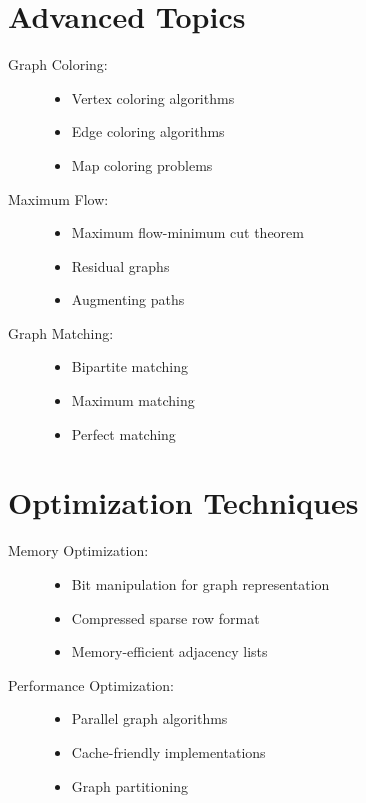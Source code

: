 \section*{Advanced Topics}
\begin{description}
    \item[Graph Coloring:] 
        \begin{itemize}
            \item Vertex coloring algorithms
            \item Edge coloring algorithms
            \item Map coloring problems
        \end{itemize}
    
    \item[Maximum Flow:] 
        \begin{itemize}
            \item Maximum flow-minimum cut theorem
            \item Residual graphs
            \item Augmenting paths
        \end{itemize}
        
    \item[Graph Matching:] 
        \begin{itemize}
            \item Bipartite matching
            \item Maximum matching
            \item Perfect matching
        \end{itemize}
\end{description}

\section*{Optimization Techniques}
\begin{description}
    \item[Memory Optimization:] 
        \begin{itemize}
            \item Bit manipulation for graph representation
            \item Compressed sparse row format
            \item Memory-efficient adjacency lists
        \end{itemize}
    
    \item[Performance Optimization:] 
        \begin{itemize}
            \item Parallel graph algorithms
            \item Cache-friendly implementations
            \item Graph partitioning
        \end{itemize}
\end{description}

